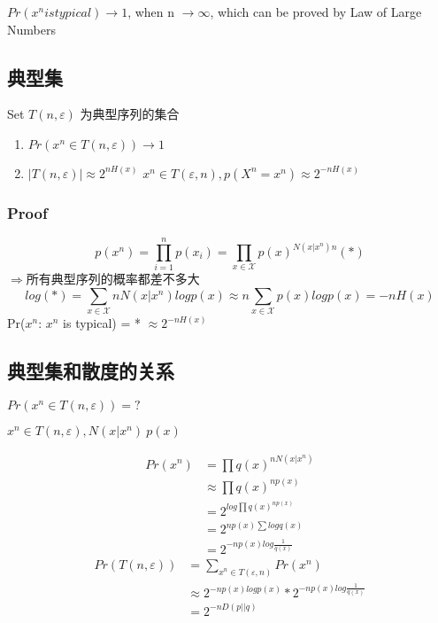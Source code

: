\documentclass[a4paper, 12pt]{article}
\begin{document}
    $Pr(x^n is typical)\rightarrow 1$, when n $\rightarrow \infty$, which can be proved by Law of Large Numbers
    \subsection{典型集}
    Set $T(n, \varepsilon)$ 为典型序列的集合

    \begin{enumerate}
        \item $Pr(x^n \in T(n, \varepsilon))\rightarrow 1$
        \item $|T(n,\varepsilon)|\approx2^{nH(x)}$
         $x^n\in T(\varepsilon, n), p(X^n=x^n)\approx 2^{-nH(x)}$
    \end{enumerate}
    \subsubsection{Proof}
    \[
        p(x^n)=\prod_{i=1}^{n}p(x_i)=\prod_{x\in \mathcal{X}}p(x)^{N(x|x^n)n} (*)
    \]
    $\Rightarrow$所有典型序列的概率都差不多大
    \[
        log(*)=\sum_{x\in \mathcal{X}}nN(x|x^n)logp(x)\approx n\sum_{x\in \mathcal{X}}p(x)logp(x)=-nH(x)
    \]
    Pr($x^n$: $x^n$ is typical) = * $\approx 2^{-nH(x)}$

    \subsection{典型集和散度的关系}
    $Pr(x^n\in T(n, \varepsilon))=?$
    
    $x^n\in T(n, \varepsilon), N(x|x^n)~p(x)$

    \begin{equation}
        \begin{aligned}
            Pr(x^n)&=\prod q(x)^{nN(x|x^n)}\\
            &\approx \prod q(x)^{np(x)}\\
            &=2^{log\prod q(x)^{np(x)}}\\
            &=2^{np(x)\sum logq(x)}\\
            &=2^{-np(x)log\frac{1}{q(x)}}
        \end{aligned}
    \end{equation}
    \begin{equation}
        \begin{aligned}
            Pr(T(n, \varepsilon)) &= \sum_{x^n \in T(\varepsilon, n)}Pr(x^n)\\
            &\approx 2^{-np(x)log p(x)}*2^{-np(x)log \frac{1}{q(x)}}\\
            &=2^{-nD(p||q)}
        \end{aligned}
    \end{equation}
\end{document}
